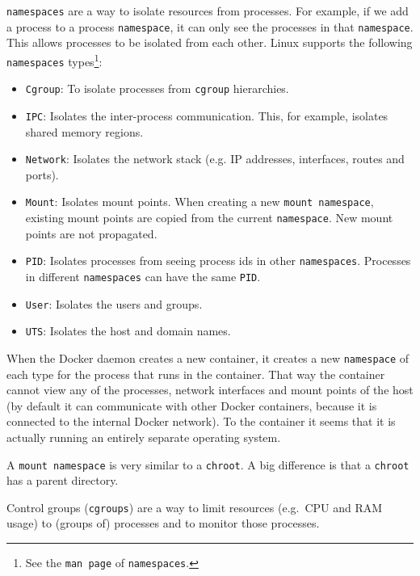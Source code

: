 \lstinline{namespaces} are a way to isolate resources from processes. For example, if we add a process to a process \lstinline{namespace}, it can only see the processes in that \lstinline{namespace}. This allows processes to be isolated from each other. Linux supports the following \lstinline{namespaces} types\footnote{See the \lstinline{man page} of \lstinline{namespaces}.}:
\begin{itemize}
    \item \lstinline{Cgroup}: To isolate processes from \lstinline{cgroup} hierarchies.
    \item \lstinline{IPC}: Isolates the inter-process communication. This, for example, isolates shared memory regions.
    \item \lstinline{Network}: Isolates the network stack (e.g. IP addresses, interfaces, routes and ports).
    \item \lstinline{Mount}: Isolates mount points. When creating a new \lstinline{mount namespace}, existing mount points are copied from the current \lstinline{namespace}. New mount points are not propagated.
    \item \lstinline{PID}: Isolates processes from seeing process ids in other \lstinline{namespaces}. Processes in different \lstinline{namespaces} can have the same \lstinline{PID}.
    \item \lstinline{User}: Isolates the users and groups.
    \item \lstinline{UTS}: Isolates the host and domain names.
\end{itemize}

When the Docker daemon creates a new container, it creates a new \lstinline{namespace} of each type for the process that runs in the container. That way the container cannot view any of the processes, network interfaces and mount points of the host (by default it can communicate with other Docker containers, because it is connected to the internal Docker network). To the container it seems that it is actually running an entirely separate operating system.

A \lstinline{mount namespace} is very similar to a \lstinline{chroot}. A big difference is that a \lstinline{chroot} has a parent directory.

\hfill

Control groups (\lstinline{cgroups}) are a way to limit resources (e.g.\ CPU and RAM usage) to (groups of) processes and to monitor those processes.

\hfill

